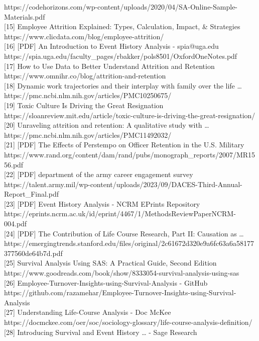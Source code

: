 \documentclass[
  letterpaper,
  DIV=11,
  numbers=noendperiod]{scrartcl}
\begin{document}
https://codehorizons.com/wp-content/uploads/2020/04/SA-Online-Sample-Materials.pdf\\
{[}15{]} Employee Attrition Explained: Types, Calculation, Impact, \&
Strategies https://www.clicdata.com/blog/employee-attrition/\\
{[}16{]} {[}PDF{]} An Introduction to Event History Analysis -
spia@uga.edu
https://spia.uga.edu/faculty\_pages/rbakker/pols8501/OxfordOneNotes.pdf\\
{[}17{]} How to Use Data to Better Understand Attrition and Retention
https://www.omnihr.co/blog/attrition-and-retention\\
{[}18{]} Dynamic work trajectories and their interplay with family over
the life \ldots{} https://pmc.ncbi.nlm.nih.gov/articles/PMC10250675/\\
{[}19{]} Toxic Culture Is Driving the Great Resignation
https://sloanreview.mit.edu/article/toxic-culture-is-driving-the-great-resignation/\\
{[}20{]} Unraveling attrition and retention: A qualitative study with
\ldots{} https://pmc.ncbi.nlm.nih.gov/articles/PMC11492032/\\
{[}21{]} {[}PDF{]} The Effects of Perstempo on Officer Retention in the
U.S. Military
https://www.rand.org/content/dam/rand/pubs/monograph\_reports/2007/MR1556.pdf\\
{[}22{]} {[}PDF{]} department of the army career engagement survey
https://talent.army.mil/wp-content/uploads/2023/09/DACES-Third-Annual-Report\_Final.pdf\\
{[}23{]} {[}PDF{]} Event History Analysis - NCRM EPrints Repository
https://eprints.ncrm.ac.uk/id/eprint/4467/1/MethodsReviewPaperNCRM-004.pdf\\
{[}24{]} {[}PDF{]} The Contribution of Life Course Research, Part II:
Causation as \ldots{}
https://emergingtrends.stanford.edu/files/original/2c61672d320e9a6fc63a6a58177377560de64b7d.pdf\\
{[}25{]} Survival Analysis Using SAS: A Practical Guide, Second Edition
https://www.goodreads.com/book/show/8333054-survival-analysis-using-sas\\
{[}26{]} Employee-Turnover-Insights-using-Survival-Analysis - GitHub
https://github.com/razamehar/Employee-Turnover-Insights-using-Survival-Analysis\\
{[}27{]} Understanding Life-Course Analysis - Doc McKee
https://docmckee.com/oer/soc/sociology-glossary/life-course-analysis-definition/\\
{[}28{]} Introducing Survival and Event History \ldots{} - Sage Research
\end{document}

